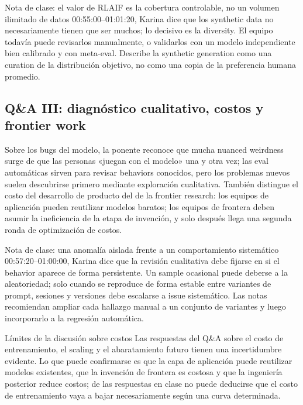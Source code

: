 \documentclass[a4paper]{article}
\begin{document}
\begin{importantbox}{Nota de clase: el valor de RLAIF es la cobertura controlable, no un volumen ilimitado de datos}
00:55:00--01:01:20, Karina dice que los synthetic data no necesariamente tienen que ser muchos; lo decisivo es la diversity. El equipo todavía puede revisarlos manualmente, o validarlos con un modelo independiente bien calibrado y con meta-eval. Describe la synthetic generation como una curation de la distribución objetivo, no como una copia de la preferencia humana promedio.
\end{importantbox}

\subsection{Q\&A III: diagnóstico cualitativo, costos y frontier work}

Sobre los bugs del modelo, la ponente reconoce que mucha nuanced weirdness surge de que las personas «juegan con el modelo» una y otra vez; las eval automáticas sirven para revisar behaviors conocidos, pero los problemas nuevos suelen descubrirse primero mediante exploración cualitativa. También distingue el costo del desarrollo de producto del de la frontier research: los equipos de aplicación pueden reutilizar modelos baratos; los equipos de frontera deben asumir la ineficiencia de la etapa de invención, y solo después llega una segunda ronda de optimización de costos.

\begin{knowledgebox}{Nota de clase: una anomalía aislada frente a un comportamiento sistemático}
00:57:20--01:00:00, Karina dice que la revisión cualitativa debe fijarse en si el behavior aparece de forma persistente. Un sample ocasional puede deberse a la aleatoriedad; solo cuando se reproduce de forma estable entre variantes de prompt, sesiones y versiones debe escalarse a issue sistemático. Las notas recomiendan ampliar cada hallazgo manual a un conjunto de variantes y luego incorporarlo a la regresión automática.
\end{knowledgebox}

\begin{warningbox}{Límites de la discusión sobre costos}
Las respuestas del Q\&A sobre el costo de entrenamiento, el scaling y el abaratamiento futuro tienen una incertidumbre evidente. Lo que puede confirmarse es que la capa de aplicación puede reutilizar modelos existentes, que la invención de frontera es costosa y que la ingeniería posterior reduce costos; de las respuestas en clase no puede deducirse que el costo de entrenamiento vaya a bajar necesariamente según una curva determinada.
\end{warningbox}
\end{document}
